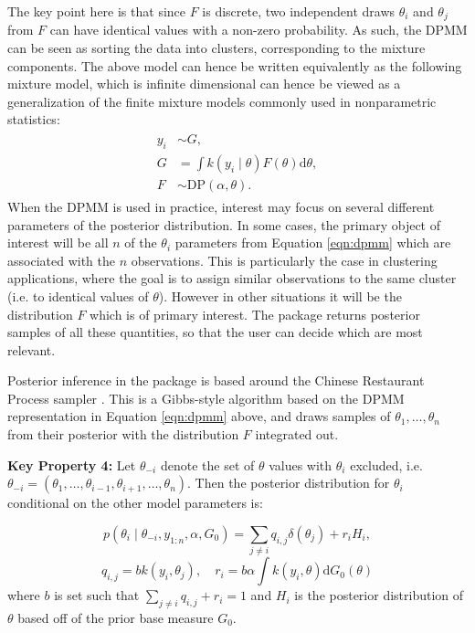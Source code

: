 \documentclass[nojss]{jss}
\begin{document}
The key point here is that since $F$ is discrete, two independent draws $\theta_i$ and $\theta_j$ from $F$  can have identical values with a non-zero probability. As such, the DPMM can be seen as sorting the data into clusters, corresponding to the mixture components. The above model can hence be written equivalently as the following mixture model, which is infinite dimensional can hence be viewed as a generalization of the finite mixture models commonly used in nonparametric statistics:
\begin{align*}
\begin{split}
y_i &\sim G, \\
G & = \int k(y_i \mid \theta) F(\theta) \mathrm{d} \theta ,\\
F &\sim \text{DP} (\alpha,\theta).
\end{split}
\label{eqn:dp2}
\end{align*}
When the DPMM is used in practice, interest may focus on several different parameters of the posterior distribution. In some cases, the primary object of interest will be all $n$ of the ${\theta_i}$ parameters from Equation \ref{eqn:dpmm} which are associated with the $n$ observations. This is particularly the case in clustering applications, where the goal is to assign similar observations to the same cluster (i.e. to identical values of $\theta$). However in other situations it will be the distribution $F$ which is of primary interest. The  package returns posterior samples of all these quantities, so that the user can decide which are most relevant.

Posterior inference in the  package is based around the Chinese Restaurant Process sampler \citep{neal_markov_2000}. This is a Gibbs-style algorithm based on the DPMM representation in Equation \ref{eqn:dpmm} above, and draws samples of $\theta_1,\ldots,\theta_n$ from their posterior with the distribution $F$ integrated out.

\begin{tcolorbox}
\textbf{Key Property 4:}  Let $\theta_{-i}$ denote the set of $\theta$ values with $\theta_i$ excluded, i.e. $\theta_{-i} = (\theta_1,\ldots,\theta_{i-1},\theta_{i+1},\ldots,\theta_n)$. Then the posterior distribution for $\theta_i$ conditional on the other model parameters is:

$$p(\theta_i \mid \theta_{-i}, y_{1:n},\alpha,G_0) = \sum _{j \neq i} q_{i,j} \delta (\theta_j ) + r_i H_i,$$
$$q_{i,j} = b k(y_i , \theta _j),  \quad r_i = b \alpha \int k(y_i , \theta) \mathrm{d} G_0 ( \theta )$$
where $b$ is set such that $\sum _{j \neq i } q_{i,j} + r_i = 1$ and $H_i$ is the posterior distribution of $\theta$ based off of the prior base measure $G_0$.
\end{tcolorbox}
\end{document}
